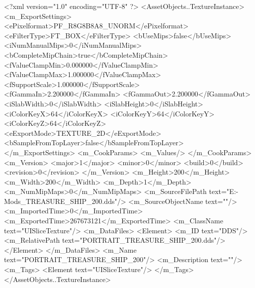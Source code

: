 <?xml version="1.0" encoding="UTF-8" ?>
<AssetObjects..TextureInstance>
	<m_ExportSettings>
		<ePixelformat>PF_R8G8B8A8_UNORM</ePixelformat>
		<eFilterType>FT_BOX</eFilterType>
		<bUseMips>false</bUseMips>
		<iNumManualMips>0</iNumManualMips>
		<bCompleteMipChain>true</bCompleteMipChain>
		<fValueClampMin>0.000000</fValueClampMin>
		<fValueClampMax>1.000000</fValueClampMax>
		<fSupportScale>1.000000</fSupportScale>
		<fGammaIn>2.200000</fGammaIn>
		<fGammaOut>2.200000</fGammaOut>
		<iSlabWidth>0</iSlabWidth>
		<iSlabHeight>0</iSlabHeight>
		<iColorKeyX>64</iColorKeyX>
		<iColorKeyY>64</iColorKeyY>
		<iColorKeyZ>64</iColorKeyZ>
		<eExportMode>TEXTURE_2D</eExportMode>
		<bSampleFromTopLayer>false</bSampleFromTopLayer>
	</m_ExportSettings>
	<m_CookParams>
		<m_Values/>
	</m_CookParams>
	<m_Version>
		<major>1</major>
		<minor>0</minor>
		<build>0</build>
		<revision>0</revision>
	</m_Version>
	<m_Height>200</m_Height>
	<m_Width>200</m_Width>
	<m_Depth>1</m_Depth>
	<m_NumMipMaps>0</m_NumMipMaps>
	<m_SourceFilePath text="E:\Games{}-Mods\Leaders\ZHUDI\pictrues\PORTRAIT_TREASURE_SHIP_200.dds"/>
	<m_SourceObjectName text=""/>
	<m_ImportedTime>0</m_ImportedTime>
	<m_ExportedTime>267673121</m_ExportedTime>
	<m_ClassName text="UISliceTexture"/>
	<m_DataFiles>
		<Element>
			<m_ID text="DDS"/>
			<m_RelativePath text="PORTRAIT_TREASURE_SHIP_200.dds"/>
		</Element>
	</m_DataFiles>
	<m_Name text="PORTRAIT_TREASURE_SHIP_200"/>
	<m_Description text=""/>
	<m_Tags>
		<Element text="UISliceTexture"/>
	</m_Tags>
</AssetObjects..TextureInstance>

